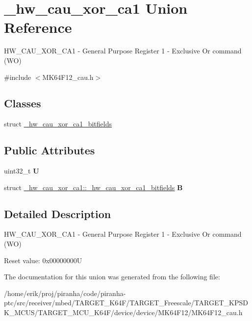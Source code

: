 \hypertarget{union__hw__cau__xor__ca1}{}\section{\+\_\+hw\+\_\+cau\+\_\+xor\+\_\+ca1 Union Reference}
\label{union__hw__cau__xor__ca1}


H\+W\+\_\+\+C\+A\+U\+\_\+\+X\+O\+R\+\_\+\+C\+A1 -\/ General Purpose Register 1 -\/ Exclusive Or command (WO)  




{\ttfamily \#include $<$M\+K64\+F12\+\_\+cau.\+h$>$}

\subsection*{Classes}
\begin{DoxyCompactItemize}
\item 
struct \hyperlink{struct__hw__cau__xor__ca1_1_1__hw__cau__xor__ca1__bitfields}{\+\_\+hw\+\_\+cau\+\_\+xor\+\_\+ca1\+\_\+bitfields}
\end{DoxyCompactItemize}
\subsection*{Public Attributes}
\begin{DoxyCompactItemize}
\item 
uint32\+\_\+t {\bfseries U}\hypertarget{union__hw__cau__xor__ca1_a3a0a268f1e626e0b353c14096056488f}{}\label{union__hw__cau__xor__ca1_a3a0a268f1e626e0b353c14096056488f}

\item 
struct \hyperlink{struct__hw__cau__xor__ca1_1_1__hw__cau__xor__ca1__bitfields}{\+\_\+hw\+\_\+cau\+\_\+xor\+\_\+ca1\+::\+\_\+hw\+\_\+cau\+\_\+xor\+\_\+ca1\+\_\+bitfields} {\bfseries B}\hypertarget{union__hw__cau__xor__ca1_a104c216dc79560625ce1199d1c6eecc4}{}\label{union__hw__cau__xor__ca1_a104c216dc79560625ce1199d1c6eecc4}

\end{DoxyCompactItemize}


\subsection{Detailed Description}
H\+W\+\_\+\+C\+A\+U\+\_\+\+X\+O\+R\+\_\+\+C\+A1 -\/ General Purpose Register 1 -\/ Exclusive Or command (WO) 

Reset value\+: 0x00000000U 

The documentation for this union was generated from the following file\+:\begin{DoxyCompactItemize}
\item 
/home/erik/proj/piranha/code/piranha-\/ptc/src/receiver/mbed/\+T\+A\+R\+G\+E\+T\+\_\+\+K64\+F/\+T\+A\+R\+G\+E\+T\+\_\+\+Freescale/\+T\+A\+R\+G\+E\+T\+\_\+\+K\+P\+S\+D\+K\+\_\+\+M\+C\+U\+S/\+T\+A\+R\+G\+E\+T\+\_\+\+M\+C\+U\+\_\+\+K64\+F/device/device/\+M\+K64\+F12/M\+K64\+F12\+\_\+cau.\+h\end{DoxyCompactItemize}
